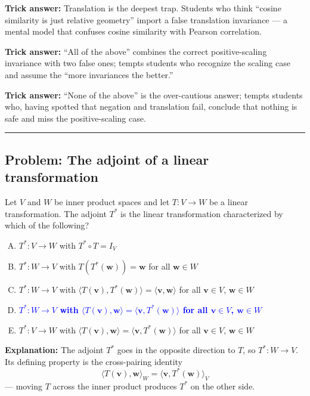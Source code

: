 \documentclass[12pt]{amsart}
\newcommand{\divider}{
  \vspace{-1em}
  \noindent
  \raisebox{-0.15ex}{\textbullet}%
  \hspace{0.5em}%
  \rule[0.5ex]{0.95\textwidth}{1.0pt}%
  \hspace{0.5em}%
  \raisebox{-0.15ex}{\textbullet}%
  \vspace{0em}
}
\begin{document}
\textbf{Trick answer:}
Translation is the deepest trap. Students who think ``cosine similarity is
just relative geometry'' import a false translation invariance --- a mental
model that confuses cosine similarity with Pearson correlation.

\textbf{Trick answer:}
``All of the above'' combines the correct positive-scaling invariance with
two false ones; tempts students who recognize the scaling case and assume
the ``more invariances the better.''

\textbf{Trick answer:}
``None of the above'' is the over-cautious answer; tempts students who,
having spotted that negation and translation fail, conclude that nothing is
safe and miss the positive-scaling case.

\divider

\subsection*{Problem: The adjoint of a linear transformation}

Let $V$ and $W$ be inner product spaces and let $T: V \to W$ be a linear
transformation. The adjoint $T^*$ is the linear transformation characterized
by which of the following?

\begin{enumerate}[(A)]
\item $T^* : V \to W$ with $T^* \circ T = I_V$
\item $T^* : W \to V$ with $T(T^*(\mathbf{w})) = \mathbf{w}$ for all $\mathbf{w} \in W$
\item $T^* : W \to V$ with $\langle T(\mathbf{v}), T^*(\mathbf{w}) \rangle = \langle \mathbf{v}, \mathbf{w} \rangle$ for all $\mathbf{v} \in V$, $\mathbf{w} \in W$
\item \textcolor{blue}{\textbf{$T^* : W \to V$ with $\langle T(\mathbf{v}), \mathbf{w} \rangle = \langle \mathbf{v}, T^*(\mathbf{w}) \rangle$ for all $\mathbf{v} \in V$, $\mathbf{w} \in W$}}
\item $T^* : V \to W$ with $\langle T(\mathbf{v}), \mathbf{w} \rangle = \langle \mathbf{v}, T^*(\mathbf{w}) \rangle$ for all $\mathbf{v} \in V$, $\mathbf{w} \in W$
\end{enumerate}

\textbf{Explanation:}
The adjoint $T^*$ goes in the opposite direction to $T$, so $T^* : W \to V$.
Its defining property is the cross-pairing identity
$$\langle T(\mathbf{v}), \mathbf{w} \rangle_W = \langle \mathbf{v}, T^*(\mathbf{w}) \rangle_V$$
--- moving $T$ across the inner product produces $T^*$ on the other side.
\end{document}
